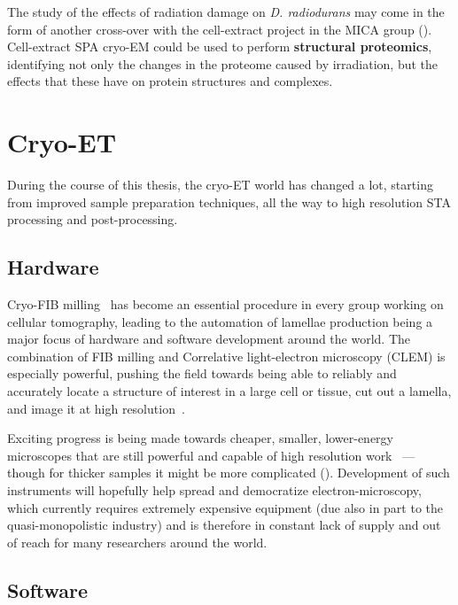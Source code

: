 The study of the effects of radiation damage on \textit{D. radiodurans} may come in the form of another cross-over with the cell-extract project in the MICA group ().
Cell-extract SPA cryo-EM could be used to perform \textbf{structural proteomics}, identifying not only the changes in the proteome caused by irradiation, but the effects that these have on protein structures and complexes.


\section{Cryo-ET}

During the course of this thesis, the cryo-ET world has changed a lot, starting from improved sample preparation techniques, all the way to high resolution STA processing and post-processing.

\subsection{Hardware}

Cryo-FIB milling~\cite{markoFocusedionbeamThinningFrozenhydrated2007} has become an essential procedure in every group working on cellular tomography, leading to the automation of lamellae production being a major focus of hardware and software development around the world.
The combination of FIB milling and Correlative light-electron microscopy (CLEM) is especially powerful, pushing the field towards being able to reliably and accurately locate a structure of interest in a large cell or tissue, cut out a lamella, and image it at high resolution~\cite{bergerCryoelectronTomographyFocused2023,debeerPreciseTargeting3D2023,klumpeModularPlatformAutomated2021}.

Exciting progress is being made towards cheaper, smaller, lower-energy microscopes that are still powerful and capable of high resolution work~\cite{naydenovaCryoEM100KeV2019,russoElectronCryomicroscopeHardware2023} --- though for thicker samples it might be more complicated ().
Development of such instruments will hopefully help spread and democratize electron-microscopy, which currently requires extremely expensive equipment (due also in part to the quasi-monopolistic industry) and is therefore in constant lack of supply and out of reach for many researchers around the world.


\subsection{Software}

